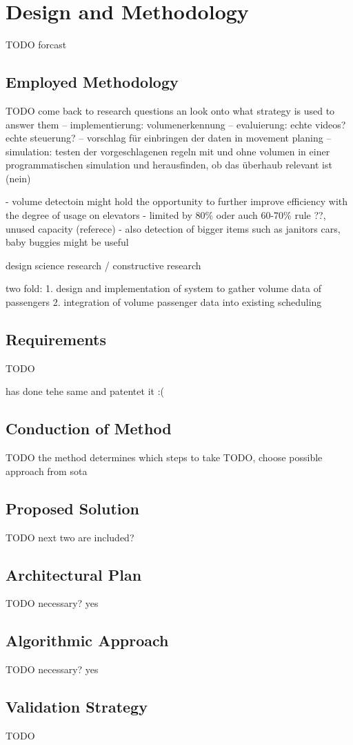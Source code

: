 \chapter{Design and Methodology}
\label{chap:design}
TODO forcast



\section{Employed Methodology}
TODO
come back to research questions an look onto what strategy is used to answer them
-- implementierung: volumenerkennung
-- evaluierung: echte videos? echte steuerung?
-- vorschlag für einbringen der daten in movement planing
-- simulation: testen der vorgeschlagenen regeln mit und ohne volumen in einer programmatischen simulation und herausfinden, ob das überhaub relevant ist (nein)

- volume detectoin might hold the opportunity to further improve efficiency with the degree of usage on elevators
- limited by 80\% oder auch 60-70\% rule \autocite[][p.~194]{unger2015aufzuege} ??, unused capacity (referece)
- also detection of bigger items such as janitors cars, baby buggies  might be useful

design science research / constructive research

two fold:
1. design and implementation of system to gather volume data of passengers
2. integration of volume passenger data into existing scheduling

\section{Requirements}
TODO

\autocite[][]{xang2016trafficlist} has done tehe same and patentet it :(

\section{Conduction of Method}
TODO the method determines which steps to take
TODO, choose possible approach from sota

\section{Proposed Solution}
TODO next two are included?

\section{Architectural Plan}
TODO necessary? yes

\section{Algorithmic Approach}
TODO necessary? yes

\section{Validation Strategy}

TODO